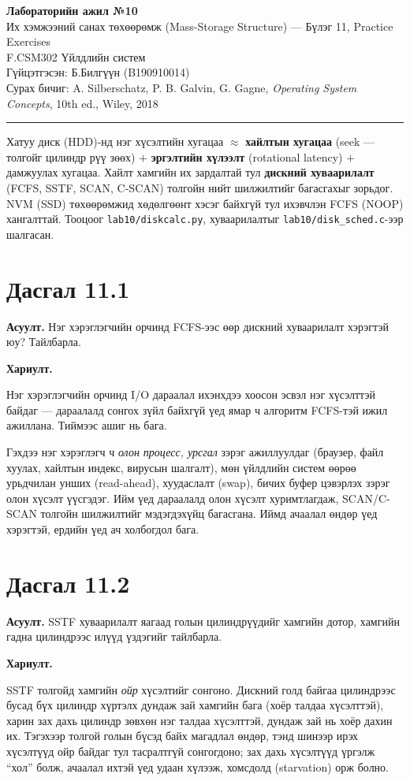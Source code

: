 \documentclass[12pt,a4paper]{article}
\newcommand{\question}[2]{\section{Дасгал #1}\textbf{Асуулт.} #2\par\medskip\textbf{Хариулт.}\par}
\begin{document}
\begin{center}
  {\Large\bfseries Лабораторийн ажил №10}\\[0.4em]
  {\large Их хэмжээний санах төхөөрөмж (Mass-Storage Structure) — Бүлэг 11, Practice Exercises}\\[0.8em]
  F.CSM302 Үйлдлийн систем\\
  Гүйцэтгэсэн: Б.Билгүүн (B190910014)\\[0.3em]
  Сурах бичиг: A. Silberschatz, P. B. Galvin, G. Gagne, \textit{Operating System Concepts}, 10th ed., Wiley, 2018
\end{center}
\hrule
\bigskip

Хатуу диск (HDD)-нд нэг хүсэлтийн хугацаа $\approx$ \textbf{хайлтын хугацаа} (seek — толгойг цилиндр рүү зөөх) $+$ \textbf{эргэлтийн хүлээлт} (rotational latency) $+$ дамжуулах хугацаа. Хайлт хамгийн их зардалтай тул \textbf{дискний хуваарилалт} (FCFS, SSTF, SCAN, C-SCAN) толгойн нийт шилжилтийг багасгахыг зорьдог. NVM (SSD) төхөөрөмжид хөдөлгөөнт хэсэг байхгүй тул ихэвчлэн FCFS (NOOP) хангалттай. Тооцоог \texttt{lab10/diskcalc.py}, хуваарилалтыг \texttt{lab10/disk\_sched.c}-ээр шалгасан.

\question{11.1}{Нэг хэрэглэгчийн орчинд FCFS-ээс өөр дискний хуваарилалт хэрэгтэй юу? Тайлбарла.}

Нэг хэрэглэгчийн орчинд I/O дараалал ихэнхдээ хоосон эсвэл нэг хүсэлттэй байдаг — дараалалд сонгох зүйл байхгүй үед ямар ч алгоритм FCFS-тэй ижил ажиллана. Тиймээс ашиг нь бага.

Гэхдээ нэг хэрэглэгч ч \emph{олон процесс, урсгал} зэрэг ажиллуулдаг (браузер, файл хуулах, хайлтын индекс, вирусын шалгалт), мөн үйлдлийн систем өөрөө урьдчилан унших (read-ahead), хуудаслалт (swap), бичих буфер цэвэрлэх зэрэг олон хүсэлт үүсгэдэг. Ийм үед дараалалд олон хүсэлт хуримтлагдаж, SCAN/C-SCAN толгойн шилжилтийг мэдэгдэхүйц багасгана. Иймд ачаалал өндөр үед хэрэгтэй, ердийн үед ач холбогдол бага.

\question{11.2}{SSTF хуваарилалт яагаад голын цилиндрүүдийг хамгийн дотор, хамгийн гадна цилиндрээс илүүд үздэгийг тайлбарла.}

SSTF толгойд хамгийн \emph{ойр} хүсэлтийг сонгоно. Дискний голд байгаа цилиндрээс бусад бүх цилиндр хүртэлх дундаж зай хамгийн бага (хоёр талдаа хүсэлттэй), харин зах дахь цилиндр зөвхөн нэг талдаа хүсэлттэй, дундаж зай нь хоёр дахин их. Тэгэхээр толгой голын бүсэд байх магадлал өндөр, тэнд шинээр ирэх хүсэлтүүд ойр байдаг тул тасралтгүй сонгогдоно; зах дахь хүсэлтүүд үргэлж “хол” болж, ачаалал ихтэй үед удаан хүлээж, хомсдолд (starvation) орж болно.
\end{document}
